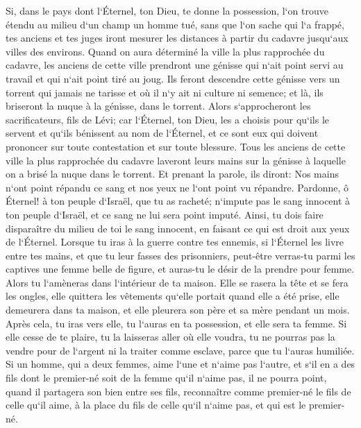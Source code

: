 \verse Si, dans le pays dont l`Éternel, ton Dieu, te donne la possession, l`on trouve étendu au milieu d`un champ un homme tué, sans que l`on sache qui l`a frappé, 
\verse tes anciens et tes juges iront mesurer les distances à partir du cadavre jusqu`aux villes des environs. 
\verse Quand on aura déterminé la ville la plus rapprochée du cadavre, les anciens de cette ville prendront une génisse qui n`ait point servi au travail et qui n`ait point tiré au joug. 
\verse Ils feront descendre cette génisse vers un torrent qui jamais ne tarisse et où il n`y ait ni culture ni semence; et là, ils briseront la nuque à la génisse, dans le torrent. 
\verse Alors s`approcheront les sacrificateurs, fils de Lévi; car l`Éternel, ton Dieu, les a choisis pour qu`ils le servent et qu`ils bénissent au nom de l`Éternel, et ce sont eux qui doivent prononcer sur toute contestation et sur toute blessure. 
\verse Tous les anciens de cette ville la plus rapprochée du cadavre laveront leurs mains sur la génisse à laquelle on a brisé la nuque dans le torrent. 
\verse Et prenant la parole, ils diront: Nos mains n`ont point répandu ce sang et nos yeux ne l`ont point vu répandre. 
\verse Pardonne, ô Éternel! à ton peuple d`Israël, que tu as racheté; n`impute pas le sang innocent à ton peuple d`Israël, et ce sang ne lui sera point imputé. 
\verse Ainsi, tu dois faire disparaître du milieu de toi le sang innocent, en faisant ce qui est droit aux yeux de l`Éternel. 
\verse Lorsque tu iras à la guerre contre tes ennemis, si l`Éternel les livre entre tes mains, et que tu leur fasses des prisonniers, 
\verse peut-être verras-tu parmi les captives une femme belle de figure, et auras-tu le désir de la prendre pour femme. 
\verse Alors tu l`amèneras dans l`intérieur de ta maison. Elle se rasera la tête et se fera les ongles, 
\verse elle quittera les vêtements qu`elle portait quand elle a été prise, elle demeurera dans ta maison, et elle pleurera son père et sa mère pendant un mois. Après cela, tu iras vers elle, tu l`auras en ta possession, et elle sera ta femme. 
\verse Si elle cesse de te plaire, tu la laisseras aller où elle voudra, tu ne pourras pas la vendre pour de l`argent ni la traiter comme esclave, parce que tu l`auras humiliée. 
\verse Si un homme, qui a deux femmes, aime l`une et n`aime pas l`autre, et s`il en a des fils dont le premier-né soit de la femme qu`il n`aime pas, 
\verse il ne pourra point, quand il partagera son bien entre ses fils, reconnaître comme premier-né le fils de celle qu`il aime, à la place du fils de celle qu`il n`aime pas, et qui est le premier-né. 
